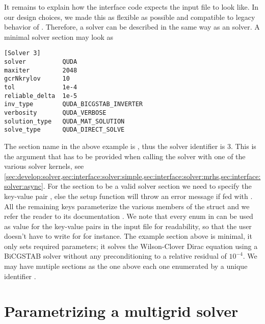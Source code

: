 It remains to explain how the interface code expects the input file to look like.
In our design choices, we made this as flexible as possible and compatible to legacy behavior of \openqxd.
Therefore, a \quda solver can be described in the same way as an \openqcd solver.
A minimal solver section may look as
\begin{verbatim}
[Solver 3]
solver          QUDA
maxiter         2048
gcrNkrylov      10
tol             1e-4
reliable_delta  1e-5
inv_type        QUDA_BICGSTAB_INVERTER
verbosity       QUDA_VERBOSE
solution_type   QUDA_MAT_SOLUTION
solve_type      QUDA_DIRECT_SOLVE
\end{verbatim}
The section name in the above example is , thus the solver identifier is \num{3}.
This is the argument  that has to be provided when calling the solver with one of the various solver kernels, see \cref{sec:develop:solver,sec:interface:solver:simple,sec:interface:solver:mrhs,sec:interface:solver:async}.
For the section to be a valid \quda solver section we need to specify the key-value pair , else the setup function will throw an error message if fed with .
All the remaining keys parameterize the various members of the  struct and we refer the reader to its documentation \cite{QUDApaper,github:quda}.
We note that every enum in  can be used as value for the key-value pairs in the input file for readability, so that the user doesn't have to write  for  for instance.
The example section above is minimal, \ie it only sets required parameters; it solves the Wilson-Clover Dirac equation using a BiCGSTAB solver without any preconditioning to a relative residual of $10^{-4}$.
We may have mutiple sections as the one above each one enumerated by a unique identifier .

\section{Parametrizing a multigrid solver}
\label{sec:running:multgrid}

